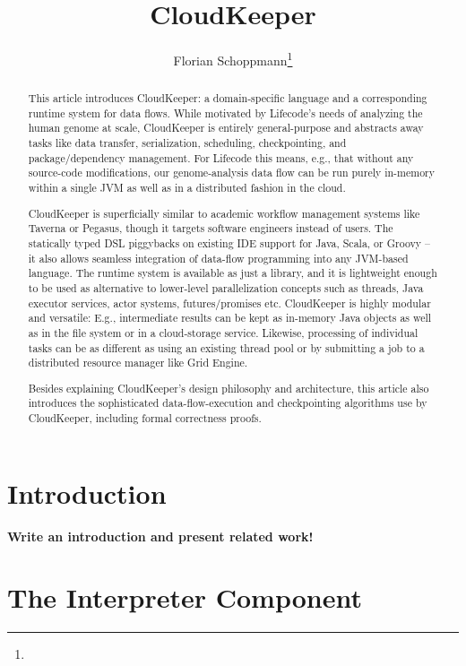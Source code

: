 \documentclass[paper=letter,fontsize=11pt,captions=tableheading]{scrartcl}
\title{CloudKeeper}
\author{Florian Schoppmann\thanks{\mailto{fschoppmann@lifecodehealth.com}}}
\numberwithin{equation}{section}
\newcommand{\todo}[1]{\textbf{\color{red}#1}}
\theoremstyle{algorithm}
\theoremstyle{plain}
\theoremstyle{nonumberplain}
\begin{document}
\maketitle

\begin{abstract}
This article introduces CloudKeeper: a domain-specific language and a corresponding runtime system for data flows. While motivated by Lifecode's needs of analyzing the human genome at scale, CloudKeeper is entirely general-purpose and abstracts away tasks like data transfer, serialization, scheduling, checkpointing, and package/dependency management. For Lifecode this means, e.g., that without any source-code modifications, our genome-analysis data flow can be run purely in-memory within a single JVM as well as in a distributed fashion in the cloud.

CloudKeeper is superficially similar to academic workflow management systems like Taverna or Pegasus, though it targets software engineers instead of users. The statically typed DSL piggybacks on existing IDE support for Java, Scala, or Groovy -- it also allows seamless integration of data-flow programming into any JVM-based language. The runtime system is available as just a library, and it is lightweight enough to be used as alternative to lower-level parallelization concepts such as threads, Java executor services, actor systems, futures/promises etc. CloudKeeper is highly modular and versatile: E.g., intermediate results can be kept as in-memory Java objects as well as in the file system or in a cloud-storage service. Likewise, processing of individual tasks can be as different as using an existing thread pool or by submitting a job to a distributed resource manager like Grid Engine.

Besides explaining CloudKeeper's design philosophy and architecture, this article also introduces the sophisticated data-flow-execution and checkpointing algorithms use by CloudKeeper, including formal correctness proofs.
\end{abstract}

\section{Introduction}

\todo{Write an introduction and present related work!}

\section{The Interpreter Component} \label{ch:interpreter}
\end{document}
